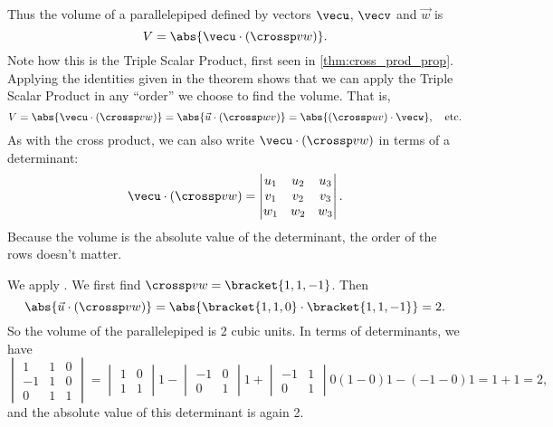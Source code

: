 Thus the volume of a parallelepiped defined by vectors $\vecu$, $\vecv$ and $\vec w$ is
\begin{equation}
V = \abs{\vecu\cdot (\crossp vw)}.\label{eq:crossp2}
\end{equation}
Note how this is the Triple Scalar Product, first seen in \autoref{thm:cross_prod_prop}. Applying the identities given in the theorem shows that we can apply the Triple Scalar Product in any ``order'' we choose to find the volume. That is,
\[V = \abs{\vecu\cdot(\crossp vw)} = \abs{\vec u\cdot (\crossp wv)} = \abs{(\crossp uv)\cdot \vecw},\quad \text{etc.}\]
As with the cross product, we can also write $\vecu\cdot(\crossp vw)$ in terms of a determinant:
\[
 \vecu\cdot(\crossp vw)=
 \begin{vmatrix}u_1&u_2&u_3\\v_1&v_2&v_3\\w_1&w_2&w_3\end{vmatrix}.
\]
Because the volume is the absolute value of the determinant, the order of the rows doesn't matter.


{We apply . We first find $\crossp vw =\bracket{1,1,-1}$. Then
\[\abs{\vec u\cdot(\crossp vw)} = \abs{\bracket{1,1,0}\cdot \bracket{1,1,-1}} = 2.\]
So the volume of the parallelepiped is 2 cubic units.  In terms of determinants, we have
\[
 \begin{vmatrix}1&1&0\\-1&1&0\\0&1&1\end{vmatrix}
 =\begin{vmatrix}1&0\\1&1\end{vmatrix}1
 -\begin{vmatrix}-1&0\\0&1\end{vmatrix}1
 +\begin{vmatrix}-1&1\\0&1\end{vmatrix}0
 (1-0)1-(-1-0)1
 =1+1
 =2,
\]
and the absolute value of this determinant is again 2.}

